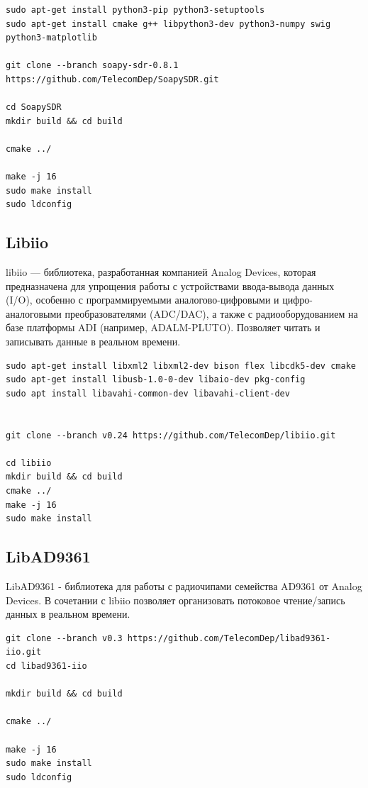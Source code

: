 \begin{lstlisting}
sudo apt-get install python3-pip python3-setuptools
sudo apt-get install cmake g++ libpython3-dev python3-numpy swig python3-matplotlib

git clone --branch soapy-sdr-0.8.1 https://github.com/TelecomDep/SoapySDR.git

cd SoapySDR
mkdir build && cd build

cmake ../

make -j 16
sudo make install
sudo ldconfig
\end{lstlisting}

\subsection{Libiio}

libiio — библиотека, разработанная компанией Analog Devices, которая предназначена для упрощения работы с устройствами ввода-вывода
данных (I/O), особенно с программируемыми аналогово-цифровыми и цифро-аналоговыми преобразователями (ADC/DAC), а также с 
радиооборудованием на базе платформы ADI (например, ADALM-PLUTO). Позволяет читать и записывать данные в реальном времени.

\begin{lstlisting}
sudo apt-get install libxml2 libxml2-dev bison flex libcdk5-dev cmake
sudo apt-get install libusb-1.0-0-dev libaio-dev pkg-config 
sudo apt install libavahi-common-dev libavahi-client-dev


git clone --branch v0.24 https://github.com/TelecomDep/libiio.git

cd libiio
mkdir build && cd build
cmake ../
make -j 16
sudo make install
\end{lstlisting}

\subsection{LibAD9361}

LibAD9361 - библиотека для работы с радиочипами семейства AD9361 от Analog Devices. В сочетании с libiio позволяет организовать 
потоковое чтение/запись данных в реальном времени.

\begin{lstlisting}
git clone --branch v0.3 https://github.com/TelecomDep/libad9361-iio.git
cd libad9361-iio

mkdir build && cd build

cmake ../

make -j 16
sudo make install
sudo ldconfig
\end{lstlisting}

